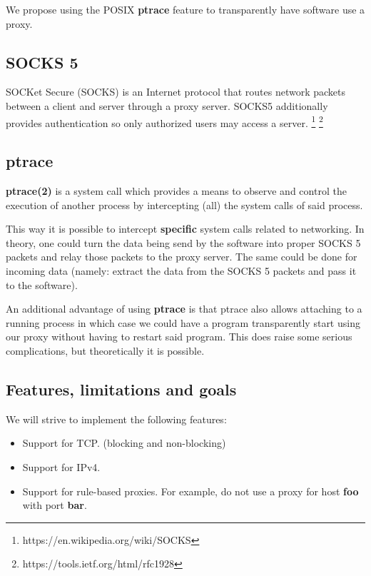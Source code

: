 \documentclass[a4paper]{article}
\begin{document}
We propose using the POSIX \textbf{ptrace} feature to transparently have
software use a proxy.

\subsection{SOCKS 5}

SOCKet Secure (SOCKS) is an Internet protocol that routes network packets
between a client and server through a proxy server. SOCKS5 additionally provides
authentication so only authorized users may access a server.
\footnote{https://en.wikipedia.org/wiki/SOCKS}
\footnote{https://tools.ietf.org/html/rfc1928}

\subsection{ptrace}

\textbf{ptrace(2)} is a system call which provides a means to observe and
control the execution of another process by intercepting (all) the system calls
of said process.

This way it is possible to intercept \textbf{specific} system calls related to
networking. In theory, one could turn the data being send by the software into
proper SOCKS 5 packets and relay those packets to the proxy server. The same
could be done for incoming data (namely: extract the data from the SOCKS 5
packets and pass it to the software).

An additional advantage of using \textbf{ptrace} is that ptrace also allows
attaching to a running process in which case we could have a program
transparently start using our proxy without having to restart said program. This
does raise some serious complications, but theoretically it is possible.

\subsection{Features, limitations and goals}

We will strive to implement the following features:

\begin{itemize}
\item Support for TCP. (blocking and non-blocking)
\item Support for IPv4.
\item Support for rule-based proxies. For example, do not use a proxy for
host \textbf{foo} with port \textbf{bar}.
\end{itemize}
\end{document}
